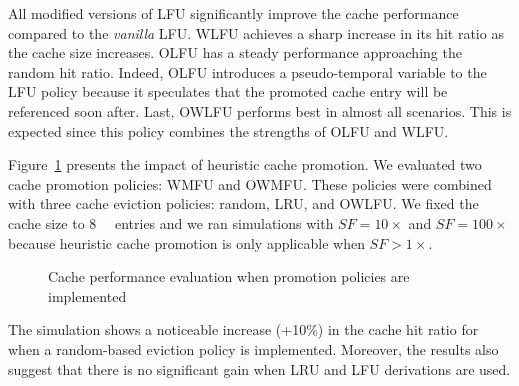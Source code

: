All modified versions of LFU significantly improve the cache performance compared to the \textit{vanilla} LFU.
WLFU achieves a sharp increase in its hit ratio as the cache size increases.
OLFU has a steady performance approaching the random hit ratio.
Indeed, OLFU introduces a pseudo-temporal variable to the LFU policy because it speculates that the promoted cache entry will be referenced soon after. 
Last, OWLFU performs best in almost all scenarios.
This is expected since this policy combines the strengths of OLFU and WLFU.

Figure~\ref{fig:promo_fig} presents the impact of heuristic cache promotion. 
We evaluated two cache promotion policies: WMFU and OWMFU.
These policies were combined with three cache eviction policies: random, LRU, and OWLFU.
We fixed the cache size to \SI{8}{\kilo\nothing} entries and we ran simulations with $SF=10\times$ and $SF=100\times$ because heuristic cache promotion is only applicable when $SF>1\times$.
\begin{figure}[]
	\centering
	\qquad
	\caption{Cache performance evaluation when promotion policies are implemented}
	\label{fig:promo_fig}
\end{figure}

The simulation shows a noticeable increase (+10\%) in the cache hit ratio for when a random-based eviction policy is implemented.
Moreover, the results also suggest that there is no significant gain when LRU and LFU derivations are used.

